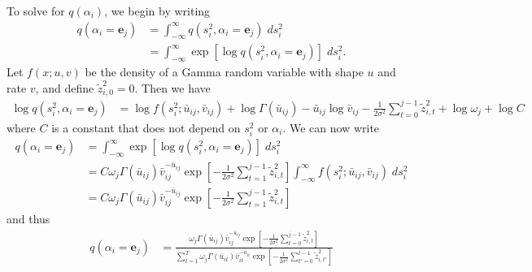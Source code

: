 \documentclass{article}
\begin{document}
\begin{itemize}
To solve for $q(\alpha_i)$, we begin by writing
\begin{align*}
    q(\alpha_i = \mathbf{e}_j) &= \int_{-\infty}^\infty q(s_i^2, \alpha_i = \mathbf{e}_j)\;ds_i^2 \\
    &= \int_{-\infty}^\infty \exp[\log q(s_i^2, \alpha_i = \mathbf{e}_j)]\;ds_i^2. 
\end{align*}
Let $f(x; u, v)$ be the density of a Gamma random variable with shape $u$ and rate $v$, and define $\widetilde{z}^2_{i,0} = 0$. Then we have
\begin{align*}
    \log q(s_i^2, \alpha_i = \mathbf{e}_j) &= \log  f(s_i^2 ; \bar{u}_{ij}, \bar{v}_{ij}) + \log  \Gamma(\bar{u}_{ij}) - \bar{u}_{ij} \log \bar{v}_{ij} - \frac{1}{2\sigma^2}\sum_{t=0}^{j-1}\widetilde{z}_{i,t}^2 + \log \omega_j + \log C
\end{align*}
where $C$ is a constant that does not depend on $s_i^2$ or $\alpha_i$. We can now write
\begin{align*}
     q(\alpha_i= \mathbf{e}_j) &= \int_{-\infty}^\infty \exp[\log q(s_i^2, \alpha_i = \mathbf{e}_j)]\;ds_i^2 \\ 
     &=  C \omega_j\Gamma(\bar{u}_{ij})\bar{v}_{ij}^{-\bar{u}_{ij}} \exp\left[ - \frac{1}{2\sigma^2}\sum_{t=1}^{j-1}\widetilde{z}_{i,t}^2\right]\int_{-\infty}^\infty f(s_i^2 ; \bar{u}_{ij}, \bar{v}_{ij})\;ds_i^2 \\
     &= C \omega_j\Gamma(\bar{u}_{ij})\bar{v}_{ij}^{-\bar{u}_{ij}}\exp\left[ - \frac{1}{2\sigma^2}\sum_{t=1}^{j-1}\widetilde{z}_{i,t}^2\right]
\end{align*}
and thus 
\begin{align*}
    q(\alpha_i= \mathbf{e}_j) &= \frac{\omega_j\Gamma(\bar{u}_{ij})\bar{v}_{ij}^{-\bar{u}_{ij}}\exp\left[ - \frac{1}{2\sigma^2}\sum_{t=0}^{j-1}\widetilde{z}_{i,t}^2\right]}{\sum_{t=1}^T\omega_j\Gamma(\bar{u}_{it})\bar{v}_{it}^{-\bar{u}_{it}}\exp\left[ - \frac{1}{2\sigma^2}\sum_{t'=0}^{t-1}\widetilde{z}_{i,t'}^2\right]}
\end{align*}

\end{itemize}
\end{document}
